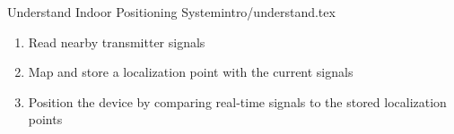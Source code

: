 \begin{notedFrame}{Understand Indoor Positioning System}{intro/understand.tex}
	\begin{enumerate}
	\item Read nearby transmitter signals
	\item	Map and store a localization point with the current signals
	\item Position the device by comparing real-time signals to the stored localization points
	\end{enumerate}
\end{notedFrame}